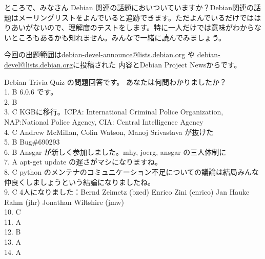 \documentclass[mingoth,a4paper]{jsarticle}
\begin{document}

ところで、みなさん Debian 関連の話題においついていますか？Debian関連の話
題はメーリングリストをよんでいると追跡できます。ただよんでいるだけではは
りあいがないので、理解度のテストをします。特に一人だけでは意味がわからな
いところもあるかも知れません。みんなで一緒に読んでみましょう。

今回の出題範囲は\url{debian-devel-announce@lists.debian.org} や \url{debian-devel@lists.debian.org}に投稿された
内容とDebian Project Newsからです。

\begin{multicols}{2}


\end{multicols}

\cleartoevenpage

 Debian Trivia Quiz の問題回答です。
 あなたは何問わかりましたか？ \\
1. B 6.0.6 です。\\
2. B \\
3. C KGBに移行。ICPA: International Criminal Police Organization, NAP:National Police Agency, CIA: Central Intelligence Agency\\
4. C Andrew McMillan, Colin Watson, Manoj Srivastava が抜けた\\
5. B Bug\#690293\\
6. B Ansgar が新しく参加しました。mhy, joerg, ansgar の三人体制に\\
7. A apt-get update の遅さがマシになりますね。\\
8. C python のメンテナのコミュニケーション不足についての議論は結局みんな仲良くしましょうという結論になりましたね。\\
9. C 4人になりました：Bernd Zeimetz (bzed) Enrico Zini (enrico) Jan Hauke Rahm (jhr) Jonathan Wiltshire (jmw) \\
10. C \\
11. A \\
12. B \\
13. A \\
14. A \\
\end{document}
